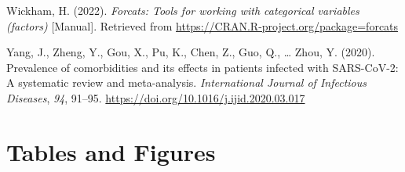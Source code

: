 \documentclass[
  man]{apa6}
\newlength{\cslhangindent}
\newlength{\cslentryspacingunit} %
\newenvironment{CSLReferences}[2] %
 {%
  \setlength{\parindent}{0pt}
  \ifodd #1
  \let\oldpar\par
  \def\par{\hangindent=\cslhangindent\oldpar}
  \fi
  \setlength{\parskip}{#2\cslentryspacingunit}
 }%
 {}
\begin{document}
\begin{CSLReferences}{1}{0}
\leavevmode{}%
Wickham, H. (2022). \emph{Forcats: {Tools} for working with categorical variables (factors)} {[}Manual{]}. Retrieved from \url{https://CRAN.R-project.org/package=forcats}

\leavevmode{}%
Yang, J., Zheng, Y., Gou, X., Pu, K., Chen, Z., Guo, Q., \ldots{} Zhou, Y. (2020). Prevalence of comorbidities and its effects in patients infected with {SARS-CoV-2}: A systematic review and meta-analysis. \emph{International Journal of Infectious Diseases}, \emph{94}, 91--95. \url{https://doi.org/10.1016/j.ijid.2020.03.017}

\end{CSLReferences}

\newpage

\hypertarget{tables-and-figures}{%
\section{Tables and Figures}\label{tables-and-figures}}


\clearpage
\renewcommand{\listfigurename}{Figure captions}

\clearpage
\renewcommand{\listtablename}{Table captions}
\end{document}
